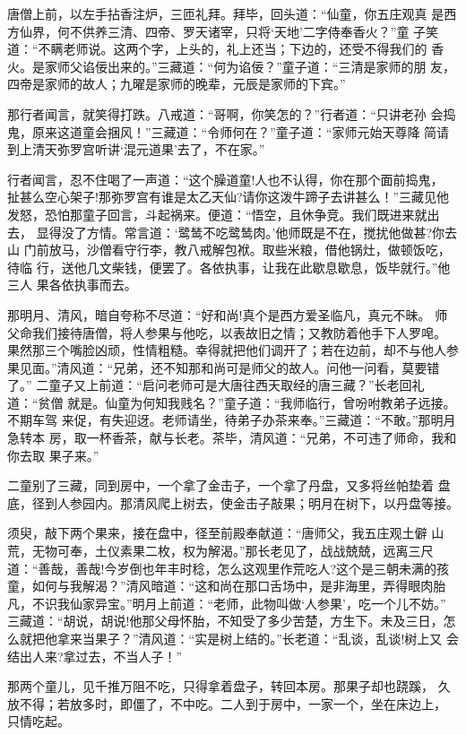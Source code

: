 唐僧上前，以左手拈香注炉，三匝礼拜。拜毕，回头道：“仙童，你五庄观真
是西方仙界，何不供养三清、四帝、罗天诸宰，只将‘天地’二字侍奉香火？”童
子笑道：“不瞒老师说。这两个字，上头的，礼上还当；下边的，还受不得我们的
香火。是家师父谄佞出来的。”三藏道：“何为谄佞？”童子道：“三清是家师的朋
友，四帝是家师的故人；九曜是家师的晚辈，元辰是家师的下宾。”

那行者闻言，就笑得打跌。八戒道：“哥啊，你笑怎的？”行者道：“只讲老孙
会捣鬼，原来这道童会捆风！”三藏道：“令师何在？”童子道：“家师元始天尊降
简请到上清天弥罗宫听讲‘混元道果’去了，不在家。”

行者闻言，忍不住喝了一声道：“这个臊道童!人也不认得，你在那个面前捣鬼，
扯甚么空心架子!那弥罗宫有谁是太乙天仙?请你这泼牛蹄子去讲甚么！”三藏见他
发怒，恐怕那童子回言，斗起祸来。便道：“悟空，且休争竞。我们既进来就出去，
显得没了方情。常言道：‘鹭鸶不吃鹭鸶肉。’他师既是不在，搅扰他做甚?你去山
门前放马，沙僧看守行李，教八戒解包袱。取些米粮，借他锅灶，做顿饭吃，待临
行，送他几文柴钱，便罢了。各依执事，让我在此歇息歇息，饭毕就行。”他三人
果各依执事而去。

那明月、清风，暗自夸称不尽道：“好和尚!真个是西方爱圣临凡，真元不昧。
师父命我们接待唐僧，将人参果与他吃，以表故旧之情；又教防着他手下人罗唣。
果然那三个嘴脸凶顽，性情粗糙。幸得就把他们调开了；若在边前，却不与他人参
果见面。”清风道：“兄弟，还不知那和尚可是师父的故人。问他一问看，莫要错了。”
二童子又上前道：“启问老师可是大唐往西天取经的唐三藏？”长老回礼道：“贫僧
就是。仙童为何知我贱名？”童子道：“我师临行，曾吩咐教弟子远接。不期车驾
来促，有失迎迓。老师请坐，待弟子办茶来奉。”三藏道：“不敢。”那明月急转本
房，取一杯香茶，献与长老。茶毕，清风道：“兄弟，不可违了师命，我和你去取
果子来。”

二童别了三藏，同到房中，一个拿了金击子，一个拿了丹盘，又多将丝帕垫着
盘底，径到人参园内。那清风爬上树去，使金击子敲果；明月在树下，以丹盘等接。

须臾，敲下两个果来，接在盘中，径至前殿奉献道：“唐师父，我五庄观土僻
山荒，无物可奉，土仪素果二枚，权为解渴。”那长老见了，战战兢兢，远离三尺
道：“善哉，善哉!今岁倒也年丰时稔，怎么这观里作荒吃人?这个是三朝未满的孩
童，如何与我解渴？”清风暗道：“这和尚在那口舌场中，是非海里，弄得眼肉胎
凡，不识我仙家异宝。”明月上前道：“老师，此物叫做‘人参果’，吃一个儿不妨。”
三藏道：“胡说，胡说!他那父母怀胎，不知受了多少苦楚，方生下。未及三日，怎
么就把他拿来当果子？”清风道：“实是树上结的。”长老道：“乱谈，乱谈!树上又
会结出人来?拿过去，不当人子！”

那两个童儿，见千推万阻不吃，只得拿着盘子，转回本房。那果子却也跷蹊，
久放不得；若放多时，即僵了，不中吃。二人到于房中，一家一个，坐在床边上，
只情吃起。


